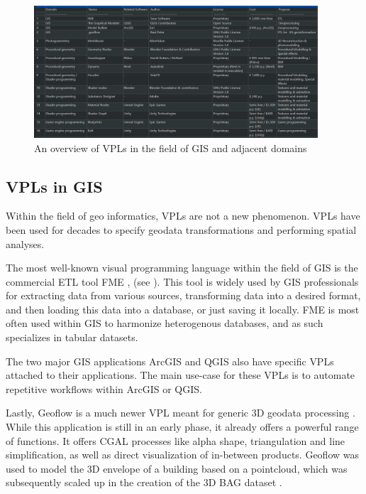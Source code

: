 \begin{figure}
  \centering
  \graphicspath{ {../../assets/tables/} }
  \includegraphics[width=400px]{geovpl.png}
  \caption{An overview of VPLs in the field of GIS and adjacent domains}
  \label{fig:geovpl:table}
\end{figure}

\subsection*{ VPLs in GIS }

Within the field of geo informatics, \ac{VPL}s are not a new phenomenon. VPLs have been used for decades to specify geodata transformations and performing spatial analyses.  

The most well-known visual programming language within the field of \ac{GIS} is the commercial \ac{ETL} tool FME \citep{safe-software_fme_2022}, (see ). 
This tool is widely used by \ac{GIS} professionals for extracting data from various sources, transforming data into a desired format, and then loading this data into a database, or just saving it locally.  
FME is most often used within GIS to harmonize heterogenous databases, and as such specializes in tabular datasets. 

The two major GIS applications ArcGIS and QGIS also have specific \ac{VPL}s attached to their applications. 
The main use-case for these \ac{VPL}s is to automate repetitive workflows within ArcGIS or QGIS. 

Lastly, Geoflow is a much newer \ac{VPL} meant for generic 3D geodata processing \citep{peters_geoflow_2019}.
While this application is still in an early phase, it already offers a powerful 
range of functions.
It offers CGAL processes like alpha shape, triangulation and line simplification, as well as direct visualization of in-between products.
Geoflow was used to model the 3D envelope of a building based on a pointcloud, which was subsequently scaled up in the creation of the 3D BAG dataset \citep{peters_geoflow_2019}.

